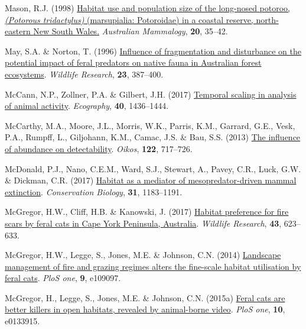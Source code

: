 \documentclass[11pt,a4paper,titlepage,twoside,openright]{style/unimelbthesis}
\newenvironment{CSLReferences}%
  {}%
  {\par}
\begin{document}
\begin{mainmatter}
\begin{CSLReferences}{1}{0}
\leavevmode{}%
Mason, R.J. (1998) \href{https://doi.org/10.1071/AM97035}{Habitat use and population size of the long-nosed potoroo, \emph{({Potorous tridactylus})} (marsupialia: Potoroidae) in a coastal reserve, north-eastern {New South Wales}.} \emph{{A}ustralian Mammalogy}, \textbf{20}, 35--42.

\leavevmode{}%
May, S.A. \& Norton, T. (1996) \href{https://doi.org/10.1071/WR9960387}{Influence of fragmentation and disturbance on the potential impact of feral predators on native fauna in {A}ustralian forest ecosystems}. \emph{Wildlife Research}, \textbf{23}, 387--400.

\leavevmode{}%
McCann, N.P., Zollner, P.A. \& Gilbert, J.H. (2017) \href{https://doi.org/10.1111/ecog.02742}{Temporal scaling in analysis of animal activity}. \emph{Ecography}, \textbf{40}, 1436--1444.

\leavevmode{}%
McCarthy, M.A., Moore, J.L., Morris, W.K., Parris, K.M., Garrard, G.E., Vesk, P.A., Rumpff, L., Giljohann, K.M., Camac, J.S. \& Bau, S.S. (2013) \href{https://doi.org/10.1111/j.1600-0706.2012.20781.x}{The influence of abundance on detectability}. \emph{Oikos}, \textbf{122}, 717--726.

\leavevmode{}%
McDonald, P.J., Nano, C.E.M., Ward, S.J., Stewart, A., Pavey, C.R., Luck, G.W. \& Dickman, C.R. (2017) \href{https://doi.org/10.1111/cobi.12905}{Habitat as a mediator of mesopredator-driven mammal extinction}. \emph{Conservation Biology}, \textbf{31}, 1183--1191.

\leavevmode{}%
McGregor, H.W., Cliff, H.B. \& Kanowski, J. (2017) \href{https://doi.org/10.1071/WR16058}{Habitat preference for fire scars by feral cats in {Cape York Peninsula, {A}ustralia}}. \emph{Wildlife Research}, \textbf{43}, 623--633.

\leavevmode{}%
McGregor, H.W., Legge, S., Jones, M.E. \& Johnson, C.N. (2014) \href{https://doi.org/10.1371/journal.pone.0109097}{Landscape management of fire and grazing regimes alters the fine-scale habitat utilisation by feral cats}. \emph{PloS one}, \textbf{9}, e109097.

\leavevmode{}%
McGregor, H., Legge, S., Jones, M.E. \& Johnson, C.N. (2015a) \href{https://doi.org/10.1371/journal.pone.0133915}{Feral cats are better killers in open habitats, revealed by animal-borne video}. \emph{PloS one}, \textbf{10}, e0133915.


\end{CSLReferences}
\end{mainmatter}
\end{document}

